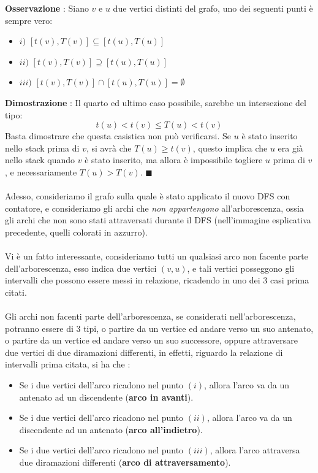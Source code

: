 \documentclass[12pt, letterpaper]{article}
\newcommand{\acc}{\\\hphantom{}\\}
\begin{document}
\textbf{Osservazione} : Siano \(v\) e \(u\) due vertici distinti del grafo, uno dei seguenti punti è sempre vero:\begin{itemize}
    \item \(i)\) $[t(v),T(v)]\subseteq[t(u),T(u)]$
    \item \(ii)\) $[t(v),T(v)]\supseteq[t(u),T(u)]$
    \item \(iii)\) $[t(v),T(v)]\cap[t(u),T(u)]=\emptyset$
\end{itemize}
\textbf{Dimostrazione} : Il quarto ed ultimo caso possibile, sarebbe un intersezione del tipo: $$
    t(u)<t(v)\le T(u)<t(v)$$ Basta dimostrare che questa casistica non può verificarsi. Se \(u\) è stato inserito
nello stack prima di \(v\), si avrà che \(T(u)\ge t(v)\), questo implica che \(u\) era già nello stack quando
\(v\) è stato inserito, ma allora è impossibile togliere \(u\) prima di \(v\), e necessariamente \(T(u)>T(v)\). \(\blacksquare\)\acc
Adesso, consideriamo il grafo sulla quale è stato applicato il nuovo DFS con contatore, e consideriamo gli archi che \textit{non appartengono}
all'arborescenza, ossia gli archi che non sono stati attraversati durante il DFS (nell'immagine esplicativa precedente, quelli colorati in
azzurro). \acc
Vi è un fatto interessante, consideriamo tutti un qualsiasi arco non facente parte dell'arborescenza, esso indica due vertici \((v,u)\),
e tali vertici posseggono gli intervalli che possono essere messi in relazione, ricadendo in uno dei 3 casi prima citati.\acc Gli archi
non facenti parte dell'arborescenza, se considerati nell'arborescenza, potranno essere di 3 tipi, o partire da un vertice ed andare
verso un suo antenato, o partire da un vertice ed andare
verso un suo successore, oppure attraversare due vertici di due diramazioni differenti, in effetti, riguardo la relazione
di intervalli prima citata, si ha che : \begin{itemize}
    \item Se i due vertici dell'arco ricadono nel punto \((i)\), allora l'arco va da un antenato ad un discendente (\textbf{arco in avanti}).
    \item Se i due vertici dell'arco ricadono nel punto \((ii)\), allora l'arco va da un discendente ad un antenato  (\textbf{arco all'indietro}).
    \item Se i due vertici dell'arco ricadono nel punto \((iii)\), allora l'arco attraversa due diramazioni differenti  (\textbf{arco di attraversamento}).
\end{itemize}
\end{document}
